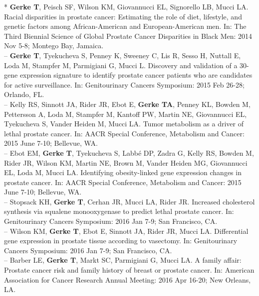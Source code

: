 \documentclass[11pt, a4paper]{article} %
\begin{document}
* {\bf Gerke T}, Peisch SF, Wilson KM, Giovannucci EL, Signorello LB, Mucci LA. Racial disparities in prostate cancer: Estimating the role of diet, lifestyle, and genetic factors among African-American and European-American men. In: The Third Biennial Science of Global Prostate Cancer Disparities in Black Men: 2014 Nov 5-8; Montego Bay, Jamaica.\\

-- {\bf Gerke T}, Tyekucheva S, Penney K, Sweeney C, Lis R, Sesso H, Nuttall E, Loda M, Stampfer M, Parmigiani G, Mucci L. Discovery and validation of a 30-gene expression signature to identify prostate cancer patients who are candidates for active surveillance. In: Genitourinary Cancers Symposium: 2015 Feb 26-28; Orlando, FL.\\

-- Kelly RS, Sinnott JA, Rider JR, Ebot E, {\bf Gerke TA}, Penney KL, Bowden M, Pettersson A, Loda M, Stampfer M, Kantoff PW, Martin NE, Giovannucci EL, Tyekucheva S, Vander Heiden M, Mucci LA. Tumor metabolism as a driver of lethal prostate cancer. In: AACR Special Conference, Metabolism and Cancer: 2015 June 7-10; Bellevue, WA.\\

-- Ebot EM, {\bf Gerke T}, Tyekucheva S, Labb\'{e} DP, Zadra G, Kelly RS, Bowden M, Rider JR, Wilson KM, Martin NE, Brown M, Vander Heiden MG, Giovannucci EL, Loda M, Mucci LA. Identifying obesity-linked gene expression changes in prostate cancer. In: AACR Special Conference, Metabolism and Cancer: 2015 June 7-10; Bellevue, WA.\\

-- Stopsack KH, {\bf Gerke T}, Cerhan JR, Mucci LA, Rider JR. Increased cholesterol synthesis via squalene monooxygenase to predict lethal prostate cancer. In: Genitourinary Cancers Symposium: 2016 Jan 7-9; San Francisco, CA.\\

-- Wilson KM, {\bf Gerke T}, Ebot E, Sinnott JA, Rider JR, Mucci LA. Differential gene expression in prostate tissue according to vasectomy. In: Genitourinary Cancers Symposium: 2016 Jan 7-9; San Francisco, CA.\\

-- Barber LE, {\bf Gerke T}, Markt SC, Parmigiani G, Mucci LA. A family affair: Prostate cancer risk and family history of breast or prostate cancer. In: American Association for Cancer Research Annual Meeting: 2016 Apr 16-20; New Orleans, LA.\\
\end{document}
